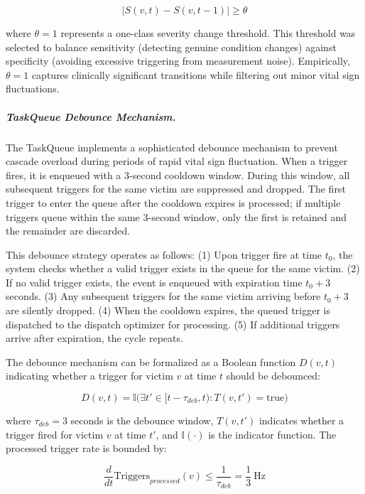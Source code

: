 \documentclass[conference]{IEEEtran}
\begin{document}
\begin{equation}
|S(v,t) - S(v,t-1)| \geq \theta
\end{equation}

where $\theta = 1$ represents a one-class severity change threshold. This threshold was selected to balance sensitivity (detecting genuine condition changes) against specificity (avoiding excessive triggering from measurement noise). Empirically, $\theta = 1$ captures clinically significant transitions while filtering out minor vital sign fluctuations.

\subparagraph{TaskQueue Debounce Mechanism.}
The TaskQueue implements a sophisticated debounce mechanism to prevent cascade overload during periods of rapid vital sign fluctuation. When a trigger fires, it is enqueued with a 3-second cooldown window. During this window, all subsequent triggers for the same victim are suppressed and dropped. The first trigger to enter the queue after the cooldown expires is processed; if multiple triggers queue within the same 3-second window, only the first is retained and the remainder are discarded.

This debounce strategy operates as follows: (1) Upon trigger fire at time $t_0$, the system checks whether a valid trigger exists in the queue for the same victim. (2) If no valid trigger exists, the event is enqueued with expiration time $t_0 + 3$ seconds. (3) Any subsequent triggers for the same victim arriving before $t_0 + 3$ are silently dropped. (4) When the cooldown expires, the queued trigger is dispatched to the dispatch optimizer for processing. (5) If additional triggers arrive after expiration, the cycle repeats.

The debounce mechanism can be formalized as a Boolean function $D(v, t)$ indicating whether a trigger for victim $v$ at time $t$ should be debounced:

\begin{equation}
D(v, t) = \mathbb{I}\bigl( \exists t' \in [t - \tau_{deb}, t) : T(v, t') = \text{true} \bigr)
\end{equation}

where $\tau_{deb} = 3$ seconds is the debounce window, $T(v, t')$ indicates whether a trigger fired for victim $v$ at time $t'$, and $\mathbb{I}(\cdot)$ is the indicator function. The processed trigger rate is bounded by:

\begin{equation}
\frac{d}{dt} \text{Triggers}_{processed}(v) \leq \frac{1}{\tau_{deb}} = \frac{1}{3}\ \text{Hz}
\end{equation}
\end{document}
